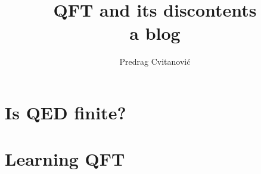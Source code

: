 \documentclass[10pt,openany]{book}
\title{QFT and its discontents
       \\ \Huge a blog}
\author{Predrag Cvitanovi\'{c}}
\begin{document}
\maketitle

\tableofcontents

\chapter{Is QED finite?}
    \label{c-finiteQED}
    
    \newpage
    
    
    \newpage
    \printbibliography[heading=subbibintoc,title={References}]

    \newpage
\chapter{Learning QFT}


    \newpage


\end{document}
